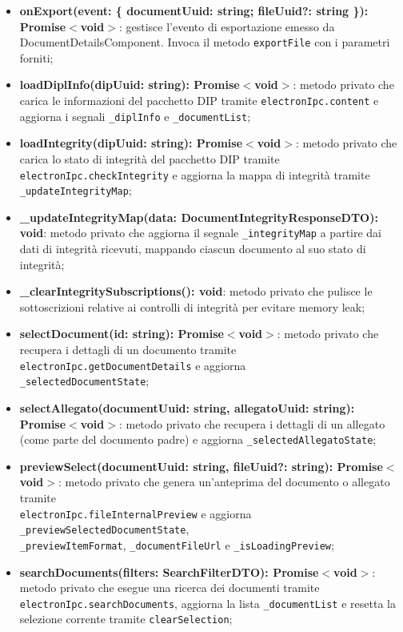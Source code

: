 \documentclass[a4paper,12pt]{article}
\begin{document}
{{{{\begin{itemize}
                    \item \textbf{onExport(event: \{ documentUuid: string; fileUuid?: string \}): Promise$<$void$>$}: gestisce l'evento di esportazione emesso da DocumentDetailsComponent. Invoca il metodo \texttt{exportFile} con i parametri forniti;
                    \item \textbf{loadDiplInfo(dipUuid: string): Promise$<$void$>$}: metodo privato che carica le informazioni del pacchetto DIP tramite \texttt{electronIpc.content} e aggiorna i segnali \texttt{\_diplInfo} e \texttt{\_documentList};
                    \item \textbf{loadIntegrity(dipUuid: string): Promise$<$void$>$}: metodo privato che carica lo stato di integrità del pacchetto DIP tramite \texttt{electronIpc.checkIntegrity} e aggiorna la mappa di integrità tramite \texttt{\_updateIntegrityMap};
                    \item \textbf{\_updateIntegrityMap(data: DocumentIntegrityResponseDTO): void}: metodo privato che aggiorna il segnale \texttt{\_integrityMap} a partire dai dati di integrità ricevuti, mappando ciascun documento al suo stato di integrità;
                    \item \textbf{\_clearIntegritySubscriptions(): void}: metodo privato che pulisce le sottoscrizioni relative ai controlli di integrità per evitare memory leak;
                    \item \textbf{selectDocument(id: string): Promise$<$void$>$}: metodo privato che recupera i dettagli di un documento tramite \texttt{electronIpc.getDocumentDetails} e aggiorna \\ \texttt{\_selectedDocumentState};
                    \item \textbf{selectAllegato(documentUuid: string, allegatoUuid: string): Promise$<$void$>$}: metodo privato che recupera i dettagli di un allegato (come parte del documento padre) e aggiorna \texttt{\_selectedAllegatoState};
                    \item \textbf{previewSelect(documentUuid: string, fileUuid?: string): Promise$<$void$>$}: metodo privato che genera un'anteprima del documento o allegato tramite \\ \texttt{electronIpc.fileInternalPreview} e aggiorna \texttt{\_previewSelectedDocumentState}, \\ \texttt{\_previewItemFormat}, \texttt{\_documentFileUrl} e \texttt{\_isLoadingPreview};
                    \item \textbf{searchDocuments(filters: SearchFilterDTO): Promise$<$void$>$}: metodo privato che esegue una ricerca dei documenti tramite \texttt{electronIpc.searchDocuments}, aggiorna la lista \texttt{\_documentList} e resetta la selezione corrente tramite \texttt{clearSelection};

\end{itemize}}}}}
\end{document}
